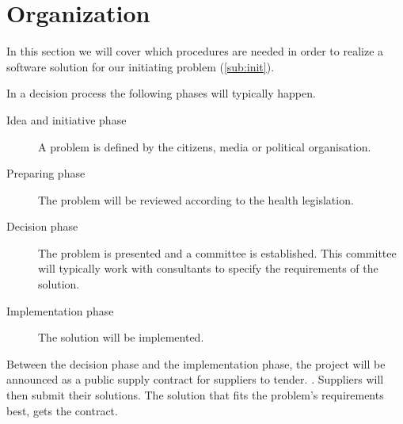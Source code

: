 \section{Organization} %
\label{sec:organization}

In this section we will cover which procedures are needed in order to realize a software solution for our initiating problem (\cref{sub:init}).

In a decision process the following phases will typically happen.

\begin{description}
	\item[Idea and initiative phase] A problem is defined by the citizens, media or political organisation.
	\item[Preparing phase] The problem will be reviewed according to the health legislation.
	\item[Decision phase] The problem is presented and a committee is established. This committee will typically work with consultants to specify the requirements of the solution.
	\item[Implementation phase] The solution will be implemented. 


\end{description}


Between the decision phase and the implementation phase, the project will be announced as a public supply contract for suppliers to tender. \cite{Union2004}. Suppliers will then submit their solutions. The solution that fits the problem's requirements best, gets the contract. 

